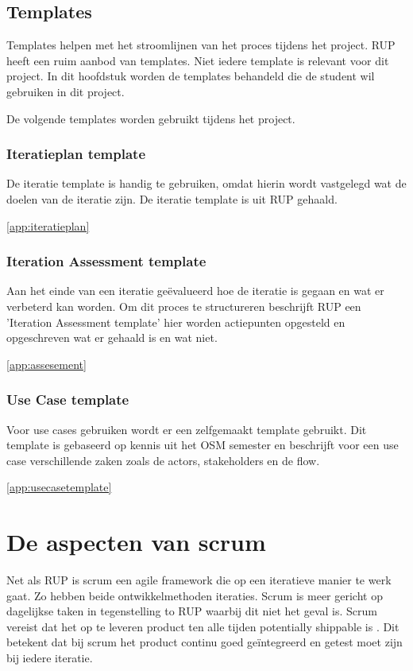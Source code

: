 \documentclass[a4paper, 11pt, oneside]{report}
\begin{document}
\subsection{Templates}
Templates helpen met het stroomlijnen van het proces tijdens het project. RUP heeft een ruim aanbod van templates. Niet iedere template is relevant voor dit project. In dit hoofdstuk worden de templates behandeld die de student wil gebruiken in dit project.

De volgende templates worden gebruikt tijdens het project.

\subsubsection{Iteratieplan template}

De iteratie template is handig te gebruiken, omdat hierin  wordt vastgelegd wat de doelen van de iteratie zijn. De iteratie template is uit RUP gehaald.

\autoref{app:iteratieplan} 

\subsubsection{Iteration Assessment template}

Aan het einde van een iteratie geëvalueerd hoe de iteratie is gegaan en wat er verbeterd kan worden. Om dit proces te structureren beschrijft RUP een 'Iteration Assessment template' hier worden actiepunten opgesteld en opgeschreven wat er gehaald is en wat niet.

\autoref{app:assesement} 
\subsubsection{Use Case template }

Voor use cases gebruiken wordt er een zelfgemaakt template gebruikt. Dit template is gebaseerd op kennis uit het OSM semester en beschrijft voor een use case verschillende zaken zoals de actors, stakeholders en de flow.

\autoref{app:usecasetemplate} 

\section{De aspecten van scrum}
Net als RUP is scrum een agile framework die op een iteratieve manier te werk gaat.
Zo hebben beide ontwikkelmethoden iteraties.
Scrum is meer gericht op dagelijkse taken in tegenstelling to RUP waarbij dit niet het geval is.
Scrum vereist dat het op te leveren product ten alle tijden potentially shippable is \cite{james}. 
Dit betekent dat bij scrum het product continu goed geïntegreerd en getest moet zijn bij iedere iteratie. 
\end{document}
